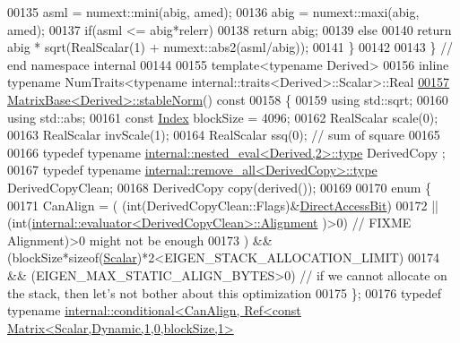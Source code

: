 \begin{DoxyCode}
00135   asml = numext::mini(abig, amed);
00136   abig = numext::maxi(abig, amed);
00137   \textcolor{keywordflow}{if}(asml <= abig*relerr)
00138     \textcolor{keywordflow}{return} abig;
00139   \textcolor{keywordflow}{else}
00140     \textcolor{keywordflow}{return} abig * sqrt(RealScalar(1) + numext::abs2(asml/abig));
00141 \}
00142 
00143 \} \textcolor{comment}{// end namespace internal}
00144 
00155 \textcolor{keyword}{template}<\textcolor{keyword}{typename} Derived>
00156 \textcolor{keyword}{inline} \textcolor{keyword}{typename} NumTraits<typename internal::traits<Derived>::Scalar>::Real
\hyperlink{group___core___module_ab84d3e64f855813b1eea4202c0697dc1}{00157} \hyperlink{group___core___module_ab84d3e64f855813b1eea4202c0697dc1}{MatrixBase<Derived>::stableNorm}()\textcolor{keyword}{ const}
00158 \textcolor{keyword}{}\{
00159   \textcolor{keyword}{using} std::sqrt;
00160   \textcolor{keyword}{using} std::abs;
00161   \textcolor{keyword}{const} \hyperlink{namespace_eigen_a62e77e0933482dafde8fe197d9a2cfde}{Index} blockSize = 4096;
00162   RealScalar scale(0);
00163   RealScalar invScale(1);
00164   RealScalar ssq(0); \textcolor{comment}{// sum of square}
00165   
00166   \textcolor{keyword}{typedef} \textcolor{keyword}{typename} \hyperlink{class_eigen_1_1internal_1_1_tensor_lazy_evaluator_writable}{internal::nested\_eval<Derived,2>::type} DerivedCopy
      ;
00167   \textcolor{keyword}{typedef} \textcolor{keyword}{typename} \hyperlink{group___sparse_core___module}{internal::remove\_all<DerivedCopy>::type} 
      DerivedCopyClean;
00168   DerivedCopy copy(derived());
00169   
00170   \textcolor{keyword}{enum} \{
00171     CanAlign = (   (int(DerivedCopyClean::Flags)&\hyperlink{group__flags_gabf1e9d0516a933445a4c307ad8f14915}{DirectAccessBit})
00172                 || (\textcolor{keywordtype}{int}(\hyperlink{struct_eigen_1_1internal_1_1evaluator}{internal::evaluator<DerivedCopyClean>::Alignment}
      )>0) \textcolor{comment}{// FIXME Alignment)>0 might not be enough}
00173                ) && (blockSize*\textcolor{keyword}{sizeof}(\hyperlink{group___core___module_a5feed465b3a8e60c47e73ecce83e39a2}{Scalar})*2<EIGEN\_STACK\_ALLOCATION\_LIMIT)
00174                  && (EIGEN\_MAX\_STATIC\_ALIGN\_BYTES>0) \textcolor{comment}{// if we cannot allocate on the stack, then let's not
       bother about this optimization}
00175   \};
00176   \textcolor{keyword}{typedef} \textcolor{keyword}{typename} 
      \hyperlink{struct_eigen_1_1internal_1_1conditional}{internal::conditional<CanAlign, Ref<const Matrix<Scalar,Dynamic,1,0,blockSize,1>}

\end{DoxyCode}
